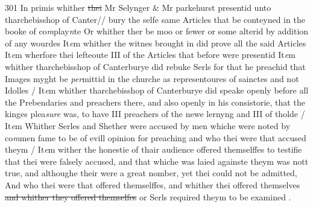 \documentclass[12pt, a4paper]{book}
\begin{document}
{\color{Mahogany}301} 
				\marginpar[\vspace{0.5cm}{\textcolor{Gray}{1}}]{}
			 In primis whither \sout{thei }
               Mr Selynger \& Mr parkehurst
			 presentid unto tharchebisshop of Canter// bury the selfe same Articles that be conteyned in the booke of co\textit{m}play\textit{n}te Or whither ther 
			be moo or fewer or some alterid by addition of any  wourdes 
				\marginpar[\vspace{0.5cm}{\textcolor{Gray}{2}}]{}
			 It\textit{e}m whither the witnes brought in did prove all the said Articles 
				\marginpar[\vspace{0.5cm}{\textcolor{Gray}{3}}]{}
			 It\textit{e}m wherfore thei lefteoute III of the Articles that before were presentid 
				\marginpar[\vspace{0.5cm}{\textcolor{Gray}{4}}]{}
			 It\textit{e}m whither tharchebisshop of Canterburye did rebuke Serls for that he preachid that Images myght be \textit{per}mittid in the churche as representoures of sainctes and not Idolles / 
				\marginpar[\vspace{0.5cm}{\textcolor{Gray}{5}}]{}
			 It\textit{e}m whither tharchebisshop of Canterburye did speake openly before all the Prebendaries and preachers there, and also openly in his  consistorie, that the kinges plea\textit{sure} was, to have III preachers of the newe lernyng and III of tholde / 
				\marginpar[\vspace{0.5cm}{\textcolor{Gray}{6}}]{}
			 It\textit{e}m Whither Serles and Shether were accused by men whiche were noted by co\textit{m}men fame to be of evill opinion for preaching and who thei were that accused theym / 
				\marginpar[\vspace{0.5cm}{\textcolor{Gray}{7}}]{}
			 It\textit{e}m wither the honestie of thair audience offered themselffes to  testifie that thei were falsely accused, and that whiche was laied againste theym was nott true, and althoughe their were  a great nomber, yet thei 
			could not be admitted, And who thei were that offered themselffes, and whither thei offered themselves \sout{and whither they offered themselfes}
               or Serls required theym to be examined
			.  
				\marginpar[\vspace{0.5cm}{\textcolor{Gray}{8}}]{}
\end{document}
